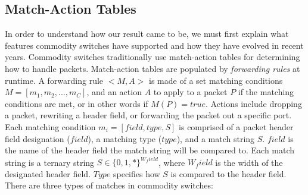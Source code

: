 \subsection{Match-Action Tables}
In order to understand how our result came to be, we must first explain what features commodity switches have supported and how they have evolved in recent years. Commodity switches traditionally use match-action tables for determining how to handle packets. Match-action tables are populated by \textit{forwarding rules} at runtime. A forwarding rule $<M, A>$ is made of a set matching conditions $M = [m_1, m_2, ..., m_C]$, and an action $A$ to apply to a packet $P$ if the matching conditions are met, or in other words if $M(P) = true$. Actions include dropping a packet, rewriting a header field, or forwarding the packet out a specific port. Each matching condition $m_i = [field, type, S]$ is comprised of a packet header field designation ($field$), a matching type ($type$), and a match string $S$. $field$ is the name of the header field the match string will be compared to. Each match string is a ternary string $S \in \{0,1,*\}^{W_field}$, where $W_field$ is the width of the designated header field. $Type$ specifies how $S$ is compared to the header field. There are three types of matches in commodity switches:
